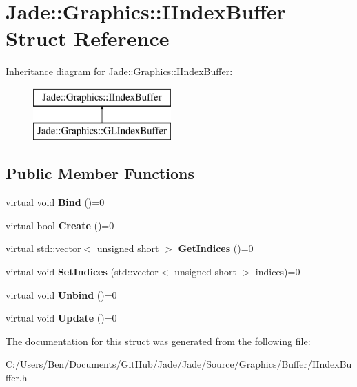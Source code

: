 \hypertarget{struct_jade_1_1_graphics_1_1_i_index_buffer}{}\section{Jade\+:\+:Graphics\+:\+:I\+Index\+Buffer Struct Reference}
\label{struct_jade_1_1_graphics_1_1_i_index_buffer}
Inheritance diagram for Jade\+:\+:Graphics\+:\+:I\+Index\+Buffer\+:\begin{figure}[H]
\begin{center}
\leavevmode
\includegraphics[height=2.000000cm]{struct_jade_1_1_graphics_1_1_i_index_buffer}
\end{center}
\end{figure}
\subsection*{Public Member Functions}
\begin{DoxyCompactItemize}
\item 
\hypertarget{struct_jade_1_1_graphics_1_1_i_index_buffer_a3be2d4a86df4b74a12f9a9143beb7719}{}virtual void {\bfseries Bind} ()=0\label{struct_jade_1_1_graphics_1_1_i_index_buffer_a3be2d4a86df4b74a12f9a9143beb7719}

\item 
\hypertarget{struct_jade_1_1_graphics_1_1_i_index_buffer_ae3e3e519a3f71f92b25f45d84a40e2d0}{}virtual bool {\bfseries Create} ()=0\label{struct_jade_1_1_graphics_1_1_i_index_buffer_ae3e3e519a3f71f92b25f45d84a40e2d0}

\item 
\hypertarget{struct_jade_1_1_graphics_1_1_i_index_buffer_a15aec0fcb1b301c43ca181631c966fdd}{}virtual std\+::vector$<$ unsigned short $>$ {\bfseries Get\+Indices} ()=0\label{struct_jade_1_1_graphics_1_1_i_index_buffer_a15aec0fcb1b301c43ca181631c966fdd}

\item 
\hypertarget{struct_jade_1_1_graphics_1_1_i_index_buffer_a099e502c707522af54532e365626c4d3}{}virtual void {\bfseries Set\+Indices} (std\+::vector$<$ unsigned short $>$ indices)=0\label{struct_jade_1_1_graphics_1_1_i_index_buffer_a099e502c707522af54532e365626c4d3}

\item 
\hypertarget{struct_jade_1_1_graphics_1_1_i_index_buffer_a1bd3c981a87bf63434d5a858def2c63a}{}virtual void {\bfseries Unbind} ()=0\label{struct_jade_1_1_graphics_1_1_i_index_buffer_a1bd3c981a87bf63434d5a858def2c63a}

\item 
\hypertarget{struct_jade_1_1_graphics_1_1_i_index_buffer_a15a6b13ff2f5c63c6c83c5d142bc26ac}{}virtual void {\bfseries Update} ()=0\label{struct_jade_1_1_graphics_1_1_i_index_buffer_a15a6b13ff2f5c63c6c83c5d142bc26ac}

\end{DoxyCompactItemize}


The documentation for this struct was generated from the following file\+:\begin{DoxyCompactItemize}
\item 
C\+:/\+Users/\+Ben/\+Documents/\+Git\+Hub/\+Jade/\+Jade/\+Source/\+Graphics/\+Buffer/I\+Index\+Buffer.\+h\end{DoxyCompactItemize}
